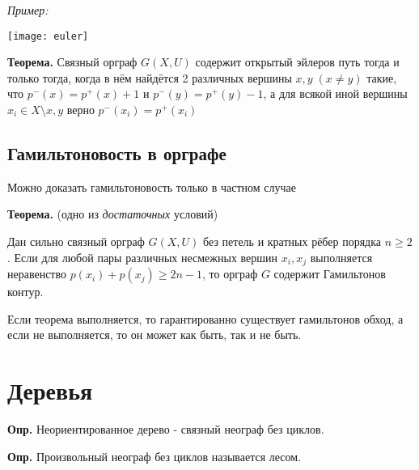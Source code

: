 \documentclass[10pt]{article}
\begin{document}
\par\textit{Пример:}
\begin{center}
    \texttt{[image: euler]}
\end{center}

\par\textbf{Теорема.} Связный орграф $G(X, U)$ содержит открытый эйлеров путь тогда и только тогда, когда в нём найдётся 2 различных вершины $x, y \; (x \neq y)$ такие, что $p^-(x) = p^+(x) + 1$ и $p^-(y) = p^+(y) - 1$, а для всякой иной вершины $x_{i} \in X \setminus {x, y}$ верно $p^-(x_{i}) = p^+(x_{i})$
\subsection*{Гамильтоновость в орграфе}
\par Можно доказать гамильтоновость только в частном случае
\par\textbf{Теорема.} (одно из \textit{достаточных} условий)
\par Дан сильно связный орграф $G(X, U)$ без петель и кратных рёбер порядка $n \geq 2$. Если для любой пары различных несмежных вершин $x_{i}, x_{j}$ выполняется неравенство $p(x_{i}) + p(x_{j}) \geq 2n - 1$, то орграф $G$ содержит Гамильтонов контур.
\par Если теорема выполняется, то гарантированно существует гамильтонов обход, а если не выполняется, то он может как быть, так и не быть.


\section*{Деревья}
\par\textbf{Опр.} Неориентированное дерево - связный неограф без циклов.
\par\textbf{Опр.} Произвольный неограф без циклов называется лесом.
\end{document}
